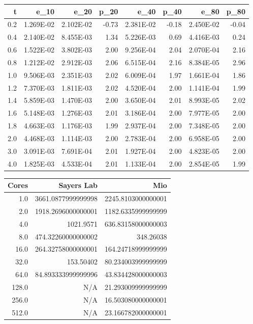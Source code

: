 \documentclass[letterpaper, 12pt]{article}
\begin{document}
	\begin{tabular}{r|rrrrrrr}
		  t        &e\_10        &e\_20        &p\_20        &e\_40        &p\_40        &e\_80        &p\_80 \\ 
		\hline
		0.2    &1.269E-02    &2.102E-02        &-0.73    &2.381E-02        &-0.18    &2.450E-02        &-0.04 \\ 
		0.4    &2.140E-02    &8.455E-03         &1.34    &5.226E-03         &0.69    &4.416E-03         &0.24 \\ 
		0.6    &1.522E-02    &3.802E-03         &2.00    &9.256E-04         &2.04    &2.070E-04         &2.16 \\ 
		0.8    &1.212E-02    &2.912E-03         &2.06    &6.515E-04         &2.16    &8.384E-05         &2.96 \\ 
		1.0    &9.506E-03    &2.351E-03         &2.02    &6.009E-04         &1.97    &1.661E-04         &1.86 \\ 
		1.2    &7.370E-03    &1.811E-03         &2.02    &4.520E-04         &2.00    &1.141E-04         &1.99 \\ 
		1.4    &5.859E-03    &1.470E-03         &2.00    &3.650E-04         &2.01    &8.993E-05         &2.02 \\ 
		1.6    &5.148E-03    &1.276E-03         &2.01    &3.186E-04         &2.00    &7.977E-05         &2.00 \\ 
		1.8    &4.663E-03    &1.176E-03         &1.99    &2.937E-04         &2.00    &7.348E-05         &2.00 \\ 
		2.0    &4.468E-03    &1.114E-03         &2.00    &2.783E-04         &2.00    &6.958E-05         &2.00 \\ 
		3.0    &3.091E-03    &7.691E-04         &2.01    &1.927E-04         &2.00    &4.823E-05         &2.00 \\ 
		4.0    &1.825E-03    &4.533E-04         &2.01    &1.133E-04         &2.00    &2.854E-05         &1.99 \\ 
	\end{tabular}
	
	\begin{tabular}{r|rr}
		Cores              &Sayers Lab                     &Mio \\ 
	\hline
		  1.0      &3661.0877999999998      &2245.8103000000001 \\ 
		  2.0      &1918.2696000000001      &1182.6335999999999 \\ 
		  4.0               &1021.9571      &636.83158000000003 \\ 
		  8.0      &474.32260000000002               &348.26038 \\ 
		 16.0      &264.32758000000001      &164.24718999999999 \\ 
		 32.0               &153.50402      &80.234003999999999 \\ 
		 64.0      &84.893333999999996      &43.834428000000003 \\ 
		128.0                     &N/A      &21.293009999999999 \\ 
		256.0                     &N/A      &16.503080000000001 \\ 
		512.0                     &N/A      &23.166782000000001 \\ 
	\end{tabular}
	
\end{document}
